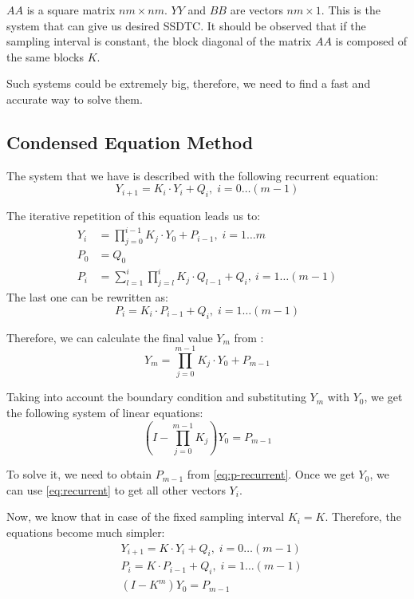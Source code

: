 $AA$ is a square matrix $nm \times nm$. $YY$ and $BB$ are vectors $nm \times 1$. This is the system that can give us desired SSDTC. It should be observed that if the sampling interval is constant, the block diagonal of the matrix $AA$ is composed of the same blocks $K$.

Such systems could be extremely big, therefore, we need to find a fast and accurate way to solve them.

\subsection{Condensed Equation Method}
The system that we have is described with the following recurrent equation:
\begin{equation} \label{eq:recurrent}
  Y_{i + 1} = K_i \cdot Y_i + Q_i, \; i = 0 \dots (m - 1)
\end{equation}

The iterative repetition of this equation leads us to:
\begin{align}
  Y_i & = \prod_{j = 0}^{i - 1} K_j \cdot Y_0 + P_{i - 1}, \; i = 1 \dots m \label{eq:y-recurrent} \\
  P_0 & = Q_0 \nonumber \\
  P_i & = \sum_{l = 1}^i \prod_{j = l}^i K_j \cdot Q_{l - 1} + Q_i, \: i = 1 \dots (m - 1) \nonumber
\end{align}
The last one can be rewritten as:
\begin{equation} \label{eq:p-recurrent}
  P_i = K_i \cdot P_{i - 1} + Q_i, \; i = 1 \dots (m - 1)
\end{equation}

Therefore, we can calculate the final value $Y_m$ from :
\[
  Y_m = \prod_{j = 0}^{m - 1} K_j \cdot Y_0 + P_{m - 1}
\]

Taking into account the boundary condition  and substituting $Y_m$ with $Y_0$, we get the following system of linear equations:
\[
  (I - \prod_{j = 0}^{m - 1} K_j) Y_0 = P_{m - 1}
\]

To solve it, we need to obtain $P_{m - 1}$ from \eqref{eq:p-recurrent}. Once we get $Y_0$, we can use \eqref{eq:recurrent} to get all other vectors $Y_i$.

Now, we know that in case of the fixed sampling interval $K_i = K$. Therefore, the equations become much simpler:
\begin{align}
  & Y_{i + 1} = K \cdot Y_i + Q_i, \; i = 0 \dots (m - 1) \nonumber \\
  & P_i = K \cdot P_{i - 1} + Q_i, \; i = 1 \dots (m - 1) \nonumber \\
  & (I - K^m) Y_0 = P_{m - 1} \label{eq:linear-system}
\end{align}

